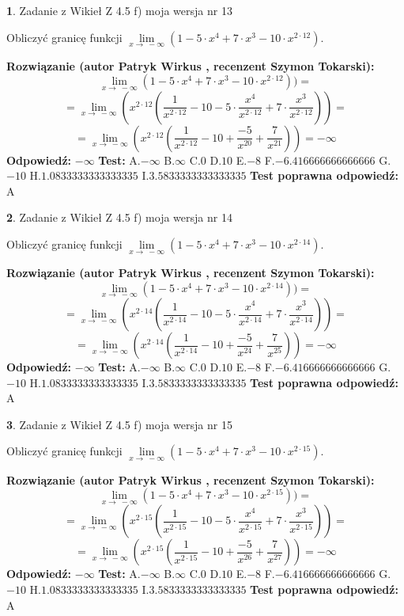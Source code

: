 \documentclass[12pt, a4paper]{article}
\theoremstyle{definition} %
\newtheorem{zad}{}
\newcommand{\zadStart}[1]{\begin{zad}#1\newline}
\newcommand{\zadStop}{\end{zad}}
\newcommand{\rozwStart}[2]{\noindent \textbf{Rozwiązanie (autor #1 , recenzent #2): }\newline}
\newcommand{\rozwStop}{\newline}
\newcommand{\odpStart}{\noindent \textbf{Odpowiedź:}\newline}
\newcommand{\odpStop}{\newline}
\newcommand{\testStart}{\noindent \textbf{Test:}\newline}
\newcommand{\testStop}{\newline}
\newcommand{\kluczStart}{\noindent \textbf{Test poprawna odpowiedź:}\newline}
\newcommand{\kluczStop}{\newline}
\begin{document}
\zadStart{Zadanie z Wikieł Z 4.5 f) moja wersja nr 13}


Obliczyć granicę funkcji  $\lim\limits_{x\to\ -\infty}(1 - 5 \cdot x^{4}+7 \cdot x^{3}- 10 \cdot x^{2\cdot12})$.
\zadStop
\rozwStart{Patryk Wirkus}{Szymon Tokarski}
$$\lim\limits_{x\to\ -\infty}(1 - 5 \cdot x^{4}+7 \cdot x^{3}- 10 \cdot x^{2\cdot12}))=$$
$$=\lim\limits_{x\to\ -\infty}(x^{2\cdot12}(\frac{1}{x^{2\cdot12}}-10 -5 \cdot \frac{x^{4}}{x^{2\cdot12}}+7 \cdot \frac{x^{3}}{x^{2\cdot12}}))=$$
$$=\lim\limits_{x\to\ -\infty}(x^{2\cdot12}(\frac{1}{x^{2\cdot12}}-10 + \frac{-5}{x^{20}}+ \frac{7}{x^{21}}))=-\infty$$
\rozwStop
\odpStart
$-\infty$
\odpStop
\testStart
A.$-\infty$ B.$\infty$ C.$0$ D.$10$ E.$-8$
F.$-6.416666666666666$ G.$-10$
H.$1.0833333333333335$
I.$3.5833333333333335$
\testStop
\kluczStart
A
\kluczStop



\zadStart{Zadanie z Wikieł Z 4.5 f) moja wersja nr 14}


Obliczyć granicę funkcji  $\lim\limits_{x\to\ -\infty}(1 - 5 \cdot x^{4}+7 \cdot x^{3}- 10 \cdot x^{2\cdot14})$.
\zadStop
\rozwStart{Patryk Wirkus}{Szymon Tokarski}
$$\lim\limits_{x\to\ -\infty}(1 - 5 \cdot x^{4}+7 \cdot x^{3}- 10 \cdot x^{2\cdot14}))=$$
$$=\lim\limits_{x\to\ -\infty}(x^{2\cdot14}(\frac{1}{x^{2\cdot14}}-10 -5 \cdot \frac{x^{4}}{x^{2\cdot14}}+7 \cdot \frac{x^{3}}{x^{2\cdot14}}))=$$
$$=\lim\limits_{x\to\ -\infty}(x^{2\cdot14}(\frac{1}{x^{2\cdot14}}-10 + \frac{-5}{x^{24}}+ \frac{7}{x^{25}}))=-\infty$$
\rozwStop
\odpStart
$-\infty$
\odpStop
\testStart
A.$-\infty$ B.$\infty$ C.$0$ D.$10$ E.$-8$
F.$-6.416666666666666$ G.$-10$
H.$1.0833333333333335$
I.$3.5833333333333335$
\testStop
\kluczStart
A
\kluczStop



\zadStart{Zadanie z Wikieł Z 4.5 f) moja wersja nr 15}


Obliczyć granicę funkcji  $\lim\limits_{x\to\ -\infty}(1 - 5 \cdot x^{4}+7 \cdot x^{3}- 10 \cdot x^{2\cdot15})$.
\zadStop
\rozwStart{Patryk Wirkus}{Szymon Tokarski}
$$\lim\limits_{x\to\ -\infty}(1 - 5 \cdot x^{4}+7 \cdot x^{3}- 10 \cdot x^{2\cdot15}))=$$
$$=\lim\limits_{x\to\ -\infty}(x^{2\cdot15}(\frac{1}{x^{2\cdot15}}-10 -5 \cdot \frac{x^{4}}{x^{2\cdot15}}+7 \cdot \frac{x^{3}}{x^{2\cdot15}}))=$$
$$=\lim\limits_{x\to\ -\infty}(x^{2\cdot15}(\frac{1}{x^{2\cdot15}}-10 + \frac{-5}{x^{26}}+ \frac{7}{x^{27}}))=-\infty$$
\rozwStop
\odpStart
$-\infty$
\odpStop
\testStart
A.$-\infty$ B.$\infty$ C.$0$ D.$10$ E.$-8$
F.$-6.416666666666666$ G.$-10$
H.$1.0833333333333335$
I.$3.5833333333333335$
\testStop
\kluczStart
A
\kluczStop
\end{document}
